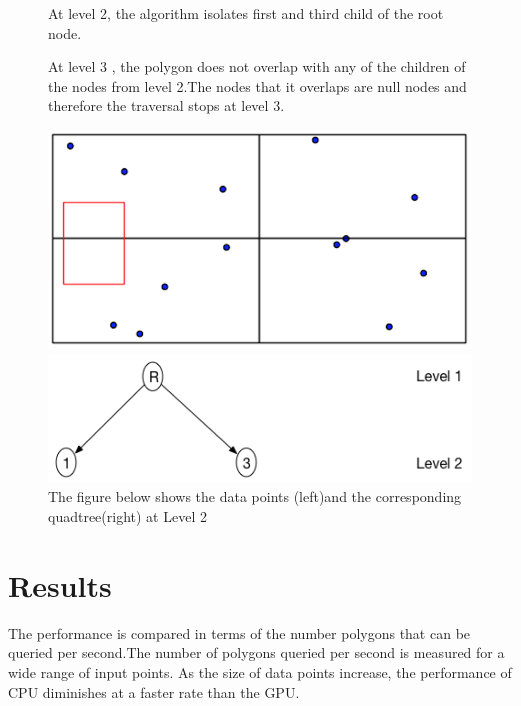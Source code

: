 \documentclass{article}
\begin{document}
\begin{figure}[H]
At level 2, the algorithm isolates first and third child of the root node.

At level 3 , the polygon does not overlap with any of the children of the nodes from level 2.The nodes that it overlaps are null nodes and therefore the traversal stops at level 3.

  \centering
  \begin{minipage}[b]{0.35\textwidth}
    \includegraphics[width=\textwidth]{NoPointQuad2}  
  \end{minipage}
  \hfill
  \begin{minipage}[b]{0.6\textwidth}
    \includegraphics[width=\textwidth]{NoPoints3_1}
  \end{minipage}
  \caption{The figure below shows the data points (left)and the corresponding quadtree(right) at Level 2}
\end{figure}


\clearpage
\section{Results}
The performance is compared in terms of the number polygons that can be queried per second.The number of polygons queried per second is measured for a wide range of input points. As the size of  data points increase, the performance of CPU diminishes at a faster rate than the GPU.
\end{document}
